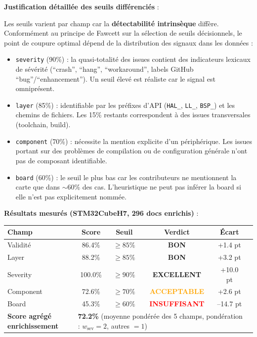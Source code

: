 \documentclass[12pt,a4paper]{report}
\begin{document}
\textbf{Justification détaillée des seuils différenciés} :

Les seuils varient par champ car la \textbf{détectabilité intrinsèque} diffère. Conformément au principe de Fawcett \cite{fawcett2006roc} sur la sélection de seuils décisionnels, le point de coupure optimal dépend de la distribution des signaux dans les données :
\begin{itemize}
  \item \texttt{severity} (90\%) : la quasi-totalité des issues contient des indicateurs lexicaux de sévérité (``crash'', ``hang'', ``workaround'', labels GitHub ``bug''/``enhancement''). Un seuil élevé est réaliste car le signal est omniprésent.
  \item \texttt{layer} (85\%) : identifiable par les préfixes d'API (\texttt{HAL\_}, \texttt{LL\_}, \texttt{BSP\_}) et les chemins de fichiers. Les 15\% restants correspondent à des issues transversales (toolchain, build).
  \item \texttt{component} (70\%) : nécessite la mention explicite d'un périphérique. Les issues portant sur des problèmes de compilation ou de configuration générale n'ont pas de composant identifiable.
  \item \texttt{board} (60\%) : le seuil le plus bas car les contributeurs ne mentionnent la carte que dans $\sim$60\% des cas. L'heuristique ne peut pas inférer la board si elle n'est pas explicitement nommée.
\end{itemize}

\textbf{Résultats mesurés (STM32CubeH7, 296 docs enrichis)} :

\begin{longtable}{lccccc}
\toprule
\textbf{Champ} & \textbf{Score} & \textbf{Seuil} & \textbf{Verdict} & \textbf{Écart} \\
\midrule
Validité & 86.4\% & $\geq 85\%$ & \textcolor{blue!60!black}{\textbf{BON}} & +1.4 pt \\
Layer & 88.2\% & $\geq 85\%$ & \textcolor{blue!60!black}{\textbf{BON}} & +3.2 pt \\
Severity & 100.0\% & $\geq 90\%$ & \textcolor{green!60!black}{\textbf{EXCELLENT}} & +10.0 pt \\
Component & 72.6\% & $\geq 70\%$ & \textcolor{orange}{\textbf{ACCEPTABLE}} & +2.6 pt \\
Board & 45.3\% & $\geq 60\%$ & \textcolor{red}{\textbf{INSUFFISANT}} & --14.7 pt \\
\midrule
\textbf{Score agrégé enrichissement} & \multicolumn{4}{l}{\textbf{72.2\%} (moyenne pondérée des 5 champs, pondération : $w_{\text{sev}}=2$, autres $=1$)} \\
\bottomrule
\end{longtable}
\end{document}
